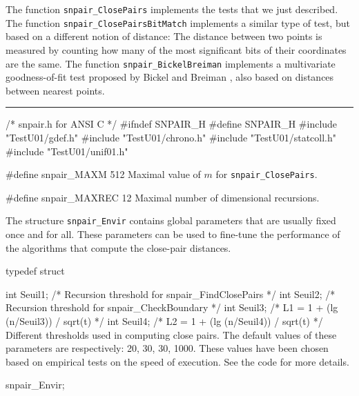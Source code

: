 The function {\tt snpair\_ClosePairs} implements the tests that we
just described.  The function {\tt snpair\_ClosePairsBitMatch}
implements a similar type of test, but based on a different notion of
distance: The distance between two points is measured by counting
how many of the most significant bits of their coordinates are the same.
The function {\tt snpair\_BickelBreiman} implements a multivariate
goodness-of-fit test proposed by Bickel and Breiman \cite{tBIC83a},
also based on distances between nearest points.


\bigskip\hrule

\code\hide
/* snpair.h  for ANSI C */
#ifndef SNPAIR_H
#define SNPAIR_H
\endhide
#include "TestU01/gdef.h"
#include "TestU01/chrono.h"
#include "TestU01/statcoll.h"
#include "TestU01/unif01.h"
\endcode




\code


#define snpair_MAXM 512
\endcode
\tab
  Maximal value of $m$ for  {\tt snpair\_ClosePairs}.
\endtab
\code


#define snpair_MAXREC 12
\endcode
\tab
 Maximal number of dimensional recursions.
\endtab

\ifdetailed  %


The structure {\tt snpair\_Envir} contains global parameters 
that are usually fixed once and for all.
These parameters can be used to fine-tune the performance of
the algorithms that compute the close-pair distances.

\code

typedef struct {

   int Seuil1;        /* Recursion threshold for snpair_FindClosePairs */
   int Seuil2;        /* Recursion threshold for snpair_CheckBoundary  */
   int Seuil3;        /* L1 = 1 + (lg (n/Seuil3)) / sqrt(t) */
   int Seuil4;        /* L2 = 1 + (lg (n/Seuil4)) / sqrt(t) */
\endcode
 \tabb
  Different thresholds used in computing close pairs.
  The default values of these parameters are respectively:
  20, 30, 30, 1000.  These values have been chosen based on 
  empirical  tests on the speed of execution.
  See the code for more details.
 \endtabb
\code

} snpair_Envir;


